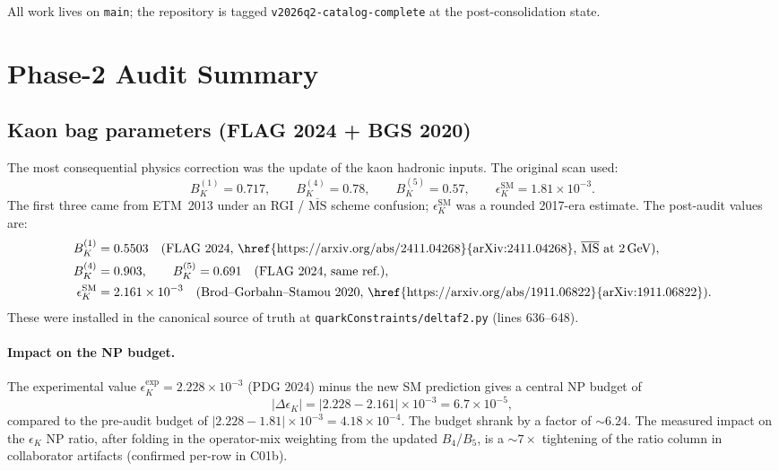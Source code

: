 \documentclass[11pt]{article}
\newcommand{\eK}{\epsilon_K}
\newcommand{\DeK}{\Delta\eK}
\begin{document}
All work lives on \texttt{main}; the repository is tagged
\texttt{v2026q2-catalog-complete} at the post-consolidation state.


\section{Phase-2 Audit Summary}
\label{sec:audits}

\subsection{Kaon bag parameters (FLAG 2024 + BGS 2020)}
\label{sec:kaon-bags}

The most consequential physics correction was the update of the kaon
hadronic inputs.  The original scan used:
\[
  B_K^{(1)} = 0.717,\qquad
  B_K^{(4)} = 0.78,\qquad
  B_K^{(5)} = 0.57,\qquad
  \eK^{\mathrm{SM}} = 1.81\times10^{-3}.
\]
The first three came from ETM~2013 under an RGI / $\overline{\mathrm{MS}}$
scheme confusion; $\eK^{\mathrm{SM}}$ was a rounded 2017-era estimate.
The post-audit values are:
\begin{align}
  B_K^{(1)} &= 0.5503 \quad\text{(FLAG 2024,
    \href{https://arxiv.org/abs/2411.04268}{arXiv:2411.04268},
    $\overline{\mathrm{MS}}$ at 2\,GeV)},\label{eq:bk1}\\
  B_K^{(4)} &= 0.903,\qquad
  B_K^{(5)} = 0.691 \quad\text{(FLAG 2024, same ref.)},\\
  \eK^{\mathrm{SM}} &= 2.161\times10^{-3}
    \quad\text{(Brod--Gorbahn--Stamou 2020,
    \href{https://arxiv.org/abs/1911.06822}{arXiv:1911.06822})}.
\end{align}
These were installed in the canonical source of truth at
\texttt{quarkConstraints/deltaf2.py} (lines 636--648).

\paragraph{Impact on the NP budget.}
The experimental value $\eK^{\mathrm{exp}} = 2.228\times10^{-3}$
(PDG 2024) minus the new SM prediction gives a central NP budget of
\[
  |\DeK| = |2.228 - 2.161|\times10^{-3} = 6.7\times10^{-5},
\]
compared to the pre-audit budget of $|2.228 - 1.81|\times10^{-3} =
4.18\times10^{-4}$.  The budget shrank by a factor of $\sim\!6.24$.
The measured impact on the $\eK$ NP ratio, after folding in the
operator-mix weighting from the updated $B_4$/$B_5$, is a
$\sim\!7\times$ tightening of the ratio column in collaborator
artifacts (confirmed per-row in C01b).
\end{document}
